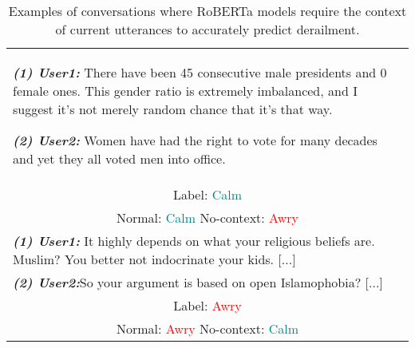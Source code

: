 \begin{table}[ht]
\renewcommand{\arraystretch}{1.0}
    \begin{tabularx}{\linewidth}{|X|}
        \hline
        \textbf{\textit{(1) User1:}} There have been 45 consecutive male presidents and 0 female ones. This gender ratio is extremely imbalanced, and I suggest it's not merely random chance that it's that way.

        \textbf{\textit{(2) User2:}} Women have had the right to vote for many decades and yet they all voted men into office.
        \\
        \multicolumn{1}{|c|}{Label: \textcolor{teal}{Calm}}
        \\ \multicolumn{1}{|c|}{Normal: \textcolor{teal}{Calm}\quad
        No-context: \textcolor{red}{Awry}}
        \\
        \hline

       \textbf{\textit{(1) User1:}} It highly depends on what your religious beliefs are. Muslim? You better not indocrinate your kids.  [...]
       \\
        \textbf{\textit{(2) User2:}}So your argument is based on open Islamophobia?   [...]
        \\
        \multicolumn{1}{|c|}{Label: \textcolor{red}{Awry}} \\
        \multicolumn{1}{|c|}{Normal: \textcolor{red}{Awry}\quad        
        No-context: \textcolor{teal}{Calm}}\\
        
        \hline

    \end{tabularx}

\caption{Examples of conversations where RoBERTa models require the context of current utterances to accurately predict derailment.}
\label{tab:intersection-example}
\end{table}
